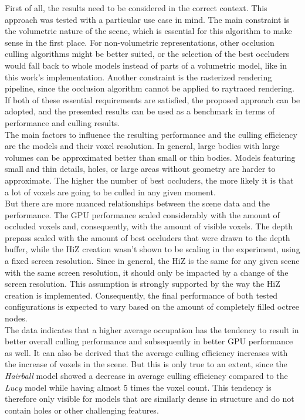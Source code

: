 \noindent
First of all, the results need to be considered in the correct context. This approach was tested with a particular use case 
in mind. The main constraint is the volumetric nature of the scene, which is essential for this algorithm to make sense in 
the first place. For non-volumetric representations, other occlusion culling algorithms might be better suited, or the 
selection of the best occluders would fall back to whole models instead of parts of a volumetric model, like in this work's 
implementation. Another constraint is the rasterized rendering pipeline, since the occlusion algorithm cannot be applied to 
raytraced rendering. If both of these essential requirements are satisfied, the proposed approach can be adopted, and the 
presented results can be used as a benchmark in terms of performance and culling results. \\

\noindent
The main factors to influence the resulting performance and the culling efficiency are the models and their voxel resolution.
In general, large bodies with large volumes can be approximated better than small or thin bodies. Models featuring small and 
thin details, holes, or large areas without geometry are harder to approximate. The higher the number of best occluders, the 
more likely it is that a lot of voxels are going to be culled in any given moment. \\

\noindent
But there are more nuanced relationships between the scene data and the performance. The \ac{GPU} performance scaled considerably 
with the amount of occluded voxels and, consequently, with the amount of visible voxels. The depth prepass scaled with the amount 
of best occluders that were drawn to the depth buffer, while the \ac{HiZ} creation wasn't shown to be scaling in the experiment, 
using a fixed screen resolution. Since in general, the \ac{HiZ} is the same for any given scene with the same screen resolution, 
it should only be impacted by a change of the screen resolution. This assumption is strongly supported by the way the \ac{HiZ} 
creation is implemented. Consequently, the final performance of both tested configurations is expected to vary based on the amount 
of completely filled octree nodes. \\

The data indicates that a higher average occupation has the tendency to result in better overall culling performance and subsequently 
in better \ac{GPU} performance as well. It can also be derived that the average culling efficiency increases with the increase of 
voxels in the scene. But this is only true to an extent, since the \emph{Hairball} model showed a decrease in average culling efficiency 
compared to the \emph{Lucy} model while having almost 5 times the voxel count. This tendency is therefore only visible for models 
that are similarly dense in structure and do not contain holes or other challenging features.\\

